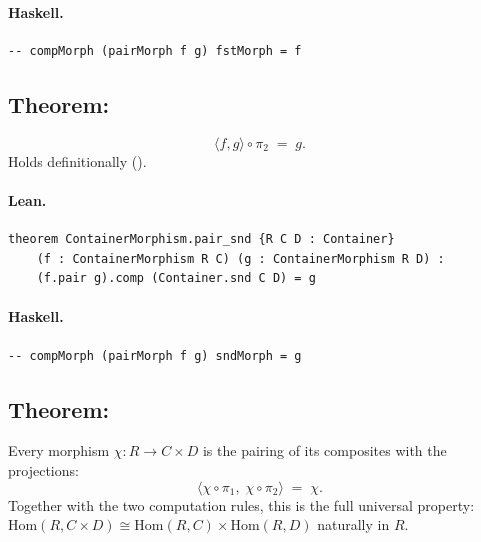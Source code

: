 \documentclass[11pt,a4paper]{article}
\begin{document}
\paragraph{Haskell.}
\begin{lstlisting}[style=haskell]
-- compMorph (pairMorph f g) fstMorph = f
\end{lstlisting}


\subsection{Theorem: }

\begin{thm}
\[
  \langle f, g \rangle \circ \pi_2 \;=\; g.
\]
Holds definitionally ().
\end{thm}

\paragraph{Lean.}
\begin{lstlisting}[style=lean]
theorem ContainerMorphism.pair_snd {R C D : Container}
    (f : ContainerMorphism R C) (g : ContainerMorphism R D) :
    (f.pair g).comp (Container.snd C D) = g
\end{lstlisting}

\paragraph{Haskell.}
\begin{lstlisting}[style=haskell]
-- compMorph (pairMorph f g) sndMorph = g
\end{lstlisting}


\subsection{Theorem: }

\begin{thm}
Every morphism $\chi : R \to C \times D$ is the pairing of its composites
with the projections:
\[
  \langle \chi \circ \pi_1,\; \chi \circ \pi_2 \rangle \;=\; \chi.
\]
Together with the two computation rules, this is the full universal property:
$\mathrm{Hom}(R, C \times D) \cong \mathrm{Hom}(R, C) \times \mathrm{Hom}(R, D)$
naturally in $R$.
\end{thm}
\end{document}
